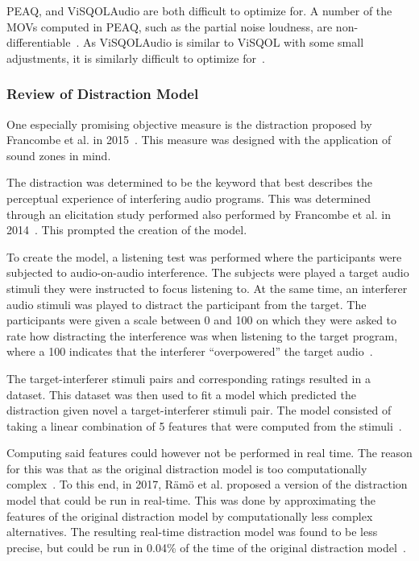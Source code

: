PEAQ, and ViSQOLAudio are both difficult to optimize for.
A number of the MOVs computed in PEAQ, such as the partial noise loudness, are non-differentiable~\cite{thiede2000peaq}.
As ViSQOLAudio is similar to ViSQOL with some small adjustments, it is similarly difficult to optimize for~\cite{hines2015visqolaudio}.

\subsubsection{Review of Distraction Model}
One especially promising objective measure is the distraction proposed by Francombe et al. in 2015~\cite{francombe2015model}.
This measure was designed with the application of sound zones in mind.

The distraction was determined to be the keyword that best describes the perceptual experience of 
interfering audio programs.
This was determined through an elicitation study performed also performed by Francombe et al. 
in 2014~\cite{francombe2014elicitation}.
This prompted the creation of the model.

To create the model, a listening test was performed where the participants were subjected to audio-on-audio interference.
The subjects were played a target audio stimuli they were instructed to focus listening to.
At the same time, an interferer audio stimuli was played to distract the participant from the target.
The participants were given a scale between 0 and 100 on which they were asked to rate how distracting the interference
was when listening to the target program, where a 100 indicates that the interferer ``overpowered'' the target audio~\cite{francombe2015model}.

The target-interferer stimuli pairs and corresponding ratings resulted in a dataset.
This dataset was then used to fit a model which predicted the distraction given novel a target-interferer stimuli pair.
The model consisted of taking a linear combination of 5 features that were computed from the stimuli~\cite{francombe2015model}.

Computing said features could however not be performed in real time.
The reason for this was that as the original distraction model is too computationally complex~\cite{ramo2017real}.
To this end, in 2017, R\"am\"o et al. proposed a version of the distraction model that could be run in real-time.
This was done by approximating the features of the original distraction model by computationally less complex alternatives.
The resulting real-time distraction model was found to be less precise, but could be run in 0.04\% of the time of the 
original distraction model~\cite{ramo2017real}.

